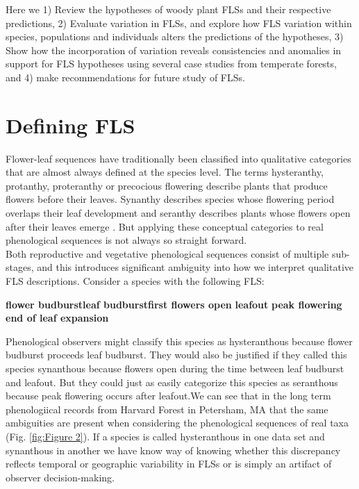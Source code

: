 \documentclass[12pt]{article}\usepackage[]{graphicx}\usepackage[]{color}
\begin{document}
\indent Here we 1) Review the hypotheses of woody plant FLSs and their respective predictions, 2) Evaluate variation in FLSs, and explore how FLS variation within species, populations and individuals alters the predictions of the hypotheses, 3) Show how the incorporation of variation reveals consistencies and anomalies in support for FLS hypotheses using several case studies from temperate forests, and 4) make recommendations for future study of FLSs. 

\section*{Defining FLS}

\indent\indent Flower-leaf sequences have traditionally been classified into qualitative categories that are almost always defined at the species level. The terms hysteranthy, protanthy, proteranthy or precocious flowering describe plants that produce flowers before their leaves. Synanthy describes species whose flowering period overlaps their leaf development and seranthy describes plants whose flowers open after their leaves emerge \citep{Lamont2011, Heinig1899}. But applying these conceptual categories to real phenological sequences is not always so straight forward.\\

\indent Both reproductive and vegetative phenological sequences consist of multiple sub-stages, and this introduces significant ambiguity into how we interpret qualitative FLS descriptions. Consider a species with the following FLS:\\
\begin{center}
\textbf{flower budburst}\rightarrow \textbf{leaf budburst}\rightarrow \textbf{first flowers open} \rightarrow \textbf{leafout} \rightarrow \textbf{peak flowering} \rightarrow \textbf{end of leaf expansion}\\
\end{center}

\indent Phenological observers might classify this species as hysteranthous because flower budburst proceeds leaf budburst. They would also be justified if they called this species synanthous because flowers open during the time between leaf budburst and leafout. But they could just as easily categorize this species as seranthous because peak flowering occurs after leafout.We can see that in the long term phenologiical records from Harvard Forest in Petersham, MA \citep{OKeefe2015} that the same ambiguities are present when considering the phenological sequences of real taxa (Fig. \ref{fig:Figure 2}). If a species is called hysteranthous in one data set and synanthous in another we have know way of knowing whether this discrepancy reflects temporal or geographic variability in FLSs or is simply an artifact of observer decision-making.\\
\end{document}
